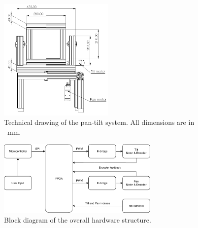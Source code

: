 \documentclass[../../main.tex]{subfiles}
\begin{document}



\begin{figure}
    \centering
    \includegraphics[width=0.5\textwidth]{Sections/Miscellaneous/Images/PhysicalMotorModel.png}
    \caption{Technical drawing of the pan-tilt system. All dimensions are in \SI{}{\milli \meter}.}
    \label{fig:Pan_Tilt_Drawing}
\end{figure}



\begin{figure}[H]
    \centering
    \includegraphics[width=0.7\textwidth]{Sections/Miscellaneous/Images/System_overview.pdf}
    \caption{Block diagram of the overall hardware structure.}
    \label{fig:SystemOverviewIntroduction}
\end{figure}
\end{document}
